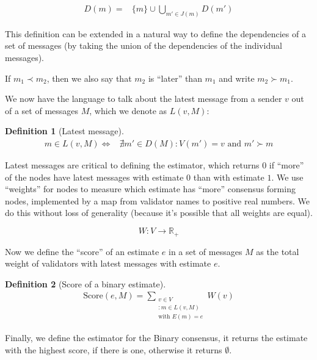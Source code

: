 \documentclass{article}
\theoremstyle{definition}
\newtheorem{defn}{Definition}[section]
\begin{document}
\begin{equation*}
\begin{split}
D(m) = &\{m\}\cup \bigcup_{m' \in J(m)} D(m')
\end{split}
\end{equation*}

This definition can be extended in a natural way to define the dependencies of a set of messages (by taking the union of the dependencies of the individual messages).

If $m_1 \prec m_2$, then we also say that $m_2$ is ``later'' than $m_1$ and write $m_2 \succ m_1$.

We now have the language to talk about the latest message from a sender $v$ out of a set of messages $M$, which we denote as $L(v, M)$:

\begin{defn}[Latest message]
\begin{equation*}
\begin{split}
m \in L(v, M) \iff & \nexists m' \in D(M) : V(m') = v \text{ and } m' \succ m
\end{split}
\end{equation*}
\end{defn}

Latest messages are critical to defining the estimator, which returns $0$ if ``more'' of the nodes have latest messages with estimate $0$ than with estimate $1$. We use ``weights'' for nodes to measure which estimate has ``more'' consensus forming nodes, implemented by a map from validator names to positive real numbers. We do this without loss of generality (because it's possible that all weights are equal).

$$
W:V \to \mathbb{R}_+
$$


Now we define the ``score'' of an estimate $e$ in a set of messages $M$ as the total weight of validators with latest messages with estimate $e$.

\begin{defn}[Score of a binary estimate]
\begin{align}
\text{Score}(e, M) = \sum_{\substack{v \in V \\ : m \in L(v,M) \\ \text{with } E(m) = e}} W(v)
\end{align}
\end{defn}

Finally, we define the estimator for the Binary consensus, it returns the estimate with the highest score, if there is one, otherwise it returns $\emptyset$.
\end{document}
